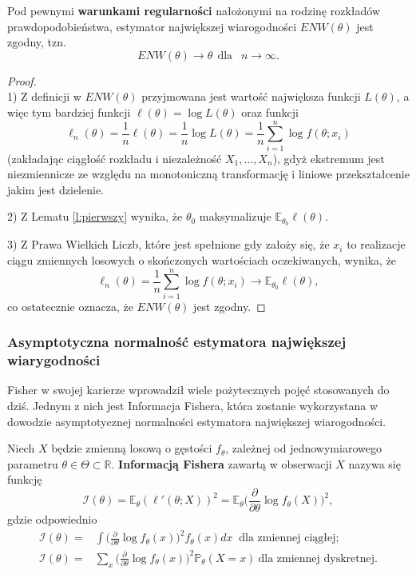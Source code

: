 \begin{theorem}
Pod pewnymi \textbf{warunkami regularności} nałożonymi na rodzinę rozkładów prawdopodobieństwa, estymator największej wiarogodności $ENW(\theta)$ jest zgodny, tzn. 
$$ENW(\theta) \rightarrow \theta \ \ \text{dla } \ \ n \rightarrow \infty.$$
\end{theorem}
\begin{proof}
\ \\
1) Z definicji w $ENW(\theta)$ przyjmowana jest wartość największa funkcji $L(\theta)$, a więc tym bardziej funkcji $ \ell(\theta) = \log L(\theta)$ oraz funkcji $$ \ell_n(\theta) = \frac{1}{n}\ell(\theta) = \frac{1}{n}\log L(\theta) = \frac{1}{n}\sum\limits_{i=1}^{n}\log f(\theta;x_i)$$ (zakładając ciągłość rozkładu i niezależność $X_1,\dots,X_n$), gdyż ekstremum jest niezmiennicze ze względu na monotoniczną transformację i liniowe przekształcenie jakim jest dzielenie.

2) Z Lematu \ref{l:pierwszy} wynika, że $\theta_0$ maksymalizuje $\mathbb{E}_{\theta_0}\ell(\theta)$.

3) Z Prawa Wielkich Liczb, które jest spełnione gdy założy się, że $x_i$ to realizacje ciągu zmiennych losowych o skończonych wartościach oczekiwanych, wynika, że $$ \ell_n(\theta) = \frac{1}{n}\sum\limits_{i=1}^{n}\log f(\theta;x_i) \rightarrow \mathbb{E}_{\theta_0}\ell(\theta),$$ co ostatecznie oznacza, że $ENW(\theta)$ jest zgodny.
\end{proof}

\newpage
\subsubsection{Asymptotyczna normalność estymatora największej wiarygodności}


Fisher w swojej karierze wprowadził wiele pożytecznych pojęć stosowanych do dziś. Jednym z nich jest Informacja Fishera, która zostanie wykorzystana w dowodzie asymptotycznej normalności estymatora największej wiarogodności.

\begin{definition}\label{inf:fish}
Niech $X$ będzie zmienną losową o gęstości $f_{\theta}$, zależnej od jednowymiarowego parametru $\theta \in \Theta \subset \mathbb{R}$. \textbf{Informacją Fishera} zawartą w obserwacji $X$ nazywa się funkcję
\begin{equation}\label{wzor:fish}
\mathcal{I}(\theta) = \mathbb{E}_{\theta}(\ell'(\theta;X))^2 = \mathbb{E}_{\theta}\Big(\frac{\partial}{\partial\theta}\log f_{\theta}(X) \Big)^2,
\end{equation}
gdzie odpowiednio
\begin{align*}
\mathcal{I}(\theta) = & \int \Big(\frac{\partial}{\partial\theta}\log f_{\theta}(x) \Big)^2 f_{\theta}(x)dx \ \text{\ \ \ \ \ dla zmiennej ciągłej;} \\
\mathcal{I}(\theta) = & \sum\limits_{x}^{ } \Big(\frac{\partial}{\partial\theta}\log f_{\theta}(x) \Big)^2 \mathbb{P}_{\theta}(X=x) \ \text{dla zmiennej dyskretnej}.
\end{align*}
\end{definition}

